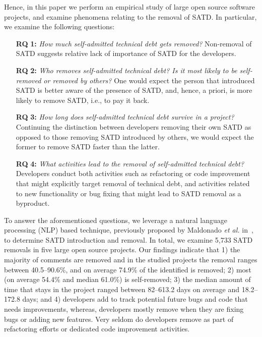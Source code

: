 Hence, in this paper we perform an empirical study of large open source software projects, and examine phenomena relating to the removal of SATD. In particular, we examine the following questions:
\begin{itemize}
	\item[\textbf{RQ}]\textbf{1:} \emph{How much self-admitted technical debt gets removed?} Non-removal of SATD suggests relative lack of importance of SATD for the developers. 
	\item[\textbf{RQ}]\textbf{2:} \emph{Who removes self-admitted technical debt? Is it most likely to be self-removed or removed by others?} One would expect the person that introduced SATD is better aware of the presence of SATD, and, hence, a priori, is more likely to remove SATD, i.e., to pay it back.
	\item[\textbf{RQ}]\textbf{3:} \emph{How long does self-admitted technical debt survive in a project?} Continuing the distinction between developers removing their own SATD as opposed to those removing SATD introduced by others, we would expect the former to remove SATD faster than the latter.
	\item[\textbf{RQ}]\textbf{4:} \emph{What activities lead to the removal of self-admitted technical debt?} Developers conduct both activities such as refactoring or code improvement that might explicitly target removal of technical debt, and activities related to new functionality or bug fixing that might lead to SATD removal as a byproduct.
\end{itemize}

To answer the aforementioned questions, we leverage a natural language processing (NLP) based technique, previously proposed by Maldonado \emph{et al.} in~\cite{Maldonado2015TSE}, to determine SATD introduction and removal. In total, we examine 5,733 SATD removals in five large open source projects. Our findings indicate that 1) the majority of \SATD comments are removed and in the studied projects the removal ranges between 40.5--90.6\%, and on average 74.9\% of the identified \SATD is removed; 2) most \SATD (on average 54.4\% and median 61.0\%) is self-removed; 3) the median amount of time that \SATD stays in the project ranged between 82--613.2 days on average and 18.2--172.8 days; and 4) developers add \SATD to track potential future bugs and code that needs improvements, whereas, developers mostly remove \SATD when they are fixing bugs or adding new features. Very seldom do developers remove \SATD as part of refactoring efforts or dedicated code improvement activities.

